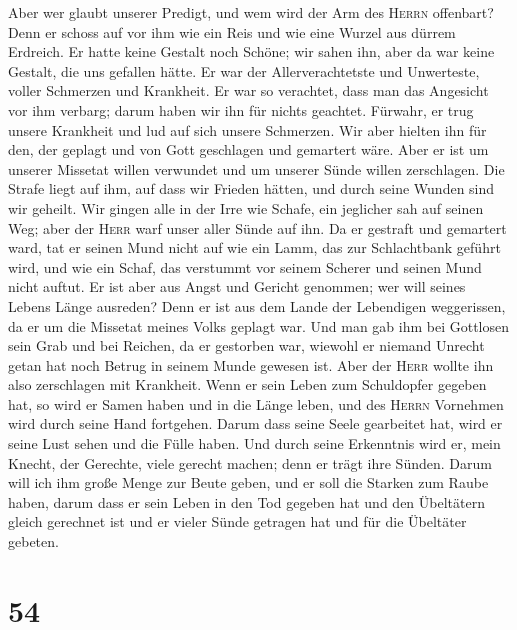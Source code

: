  Aber wer glaubt unserer Predigt, und wem wird der Arm des
\textsc{Herrn} offenbart?  Denn er schoss auf vor ihm wie
ein Reis und wie eine Wurzel aus dürrem Erdreich. Er hatte keine Gestalt
noch Schöne; wir sahen ihn, aber da war keine Gestalt, die uns gefallen
hätte.  Er war der Allerverachtetste und Unwerteste,
voller Schmerzen und Krankheit. Er war so verachtet, dass man das
Angesicht vor ihm verbarg; darum haben wir ihn für nichts geachtet.
 Fürwahr, er trug unsere Krankheit und lud auf sich unsere
Schmerzen. Wir aber hielten ihn für den, der geplagt und von Gott
geschlagen und gemartert wäre.  Aber er ist um unserer
Missetat willen verwundet und um unserer Sünde willen zerschlagen. Die
Strafe liegt auf ihm, auf dass wir Frieden hätten, und durch seine
Wunden sind wir geheilt.  Wir gingen alle in der Irre wie
Schafe, ein jeglicher sah auf seinen Weg; aber der \textsc{Herr} warf
unser aller Sünde auf ihn.  Da er gestraft und gemartert
ward, tat er seinen Mund nicht auf wie ein Lamm, das zur Schlachtbank
geführt wird, und wie ein Schaf, das verstummt vor seinem Scherer und
seinen Mund nicht auftut.  Er ist aber aus Angst und
Gericht genommen; wer will seines Lebens Länge ausreden? Denn er ist aus
dem Lande der Lebendigen weggerissen, da er um die Missetat meines Volks
geplagt war.  Und man gab ihm bei Gottlosen sein Grab und
bei Reichen, da er gestorben war, wiewohl er niemand Unrecht getan hat
noch Betrug in seinem Munde gewesen ist.  Aber der
\textsc{Herr} wollte ihn also zerschlagen mit Krankheit. Wenn er sein
Leben zum Schuldopfer gegeben hat, so wird er Samen haben und in die
Länge leben, und des \textsc{Herrn} Vornehmen wird durch seine Hand
fortgehen.  Darum dass seine Seele gearbeitet hat, wird
er seine Lust sehen und die Fülle haben. Und durch seine Erkenntnis wird
er, mein Knecht, der Gerechte, viele gerecht machen; denn er trägt ihre
Sünden.  Darum will ich ihm große Menge zur Beute geben,
und er soll die Starken zum Raube haben, darum dass er sein Leben in den
Tod gegeben hat und den Übeltätern gleich gerechnet ist und er vieler
Sünde getragen hat und für die Übeltäter gebeten.

\hypertarget{section-53}{%
\section{54}\label{section-53}}


